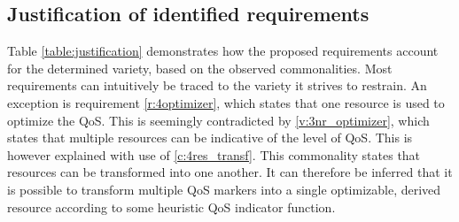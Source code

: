 \subsection{Justification of identified requirements}
Table \ref{table:justification} demonstrates how the proposed requirements account for the determined variety, based on the observed commonalities. Most requirements can intuitively be traced  to the variety it strives to restrain. An exception is requirement \ref{r:4optimizer}, which states that one resource is used to optimize the QoS. This is seemingly contradicted by \ref{v:3nr_optimizer}, which states that multiple resources can be indicative of the level of QoS. This is however explained with use of \ref{c:4res_transf}. This commonality states that resources can be transformed into one another. It can therefore be inferred that it is possible to transform multiple QoS markers into a single optimizable, derived resource according to some heuristic QoS indicator function.

